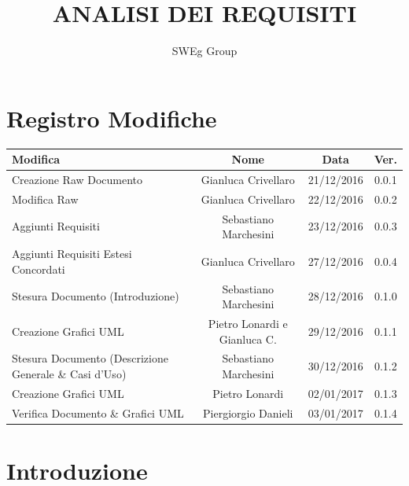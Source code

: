 \documentclass[12pt,a4paper,titlepage]{article}
\begin{document}
\title{ANALISI DEI REQUISITI}
\author{SWEg Group}
\date{}
\maketitle

\chead{}
\cfoot{}
\rfoot{\thepage}
\renewcommand{\headrulewidth}{0.2pt}
\renewcommand{\footrulewidth}{0.2pt}
\section{Registro Modifiche}
\small %

{\renewcommand\arraystretch{1.2}  %
\begin{tabular}{|l|c|c|c|}
	\hline
	{\textbf{Modifica}}&{\textbf{Nome}}&{\textbf{Data}}&{\textbf{Ver.}}\\
	\hline
	Creazione Raw Documento & Gianluca Crivellaro & 21/12/2016 & 0.0.1 \\
	\hline
	Modifica Raw & Gianluca Crivellaro & 22/12/2016 & 0.0.2 \\
	\hline
	Aggiunti Requisiti & Sebastiano Marchesini & 23/12/2016 & 0.0.3 \\
	\hline
	Aggiunti Requisiti Estesi Concordati & Gianluca Crivellaro & 27/12/2016 & 0.0.4 \\
	\hline
	Stesura Documento (Introduzione) & Sebastiano Marchesini &  28/12/2016 & 0.1.0 \\
	\hline
	Creazione Grafici UML & Pietro Lonardi e Gianluca C. & 29/12/2016 & 0.1.1 \\
	\hline
	Stesura Documento (Descrizione Generale \& Casi d'Uso) & Sebastiano Marchesini & 30/12/2016 & 0.1.2 \\
	\hline
	Creazione Grafici UML & Pietro Lonardi & 02/01/2017 & 0.1.3 \\
	\hline
	Verifica Documento \& Grafici UML & Piergiorgio Danieli & 03/01/2017 & 0.1.4 \\
	
	\hline
\end{tabular}
}	\normalsize
\newpage

\tableofcontents
\thispagestyle{empty}

\newpage



\section{Introduzione}
\end{document}
